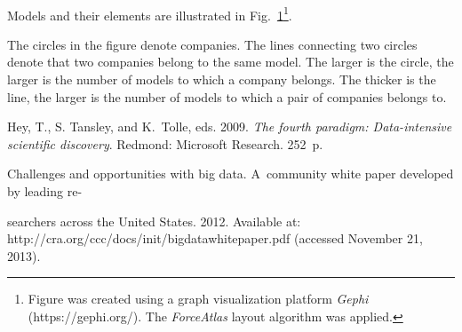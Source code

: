 \begin{figure} %
   \vspace*{1pt}
 \begin{center}
 \mbox{%
 \epsfxsize=120mm
 }
 \end{center}
 \vspace*{-9pt}
  \label{f6-kal}
  \vspace*{-3pt}
  \end{figure}

\begin{multicols}{2}
  

{\small
 Models and their elements are illustrated in Fig.~\ref{f6-kal}\footnote
 {Figure was
created using a graph visualization platform \textit{Gephi} ({\sf https://gephi.org/}).
The \textit{ForceAtlas} layout algorithm was applied.}.

The circles in the figure denote companies. The lines connecting two circles denote that
two companies belong to the same model. The larger is the circle, the larger is the number
of models to which a company belongs. The thicker is the line, the larger is the number
of models to which a pair of companies belongs to.}



{\small\frenchspacing
{%
\begin{thebibliography}{99}

Hey, T., S. Tansley, and K.~Tolle, eds. 2009. \textit{The fourth paradigm: Data-intensive
scientific discovery}. Redmond: Microsoft Research. 252~p.

Challenges and opportunities with big data.  A~community white paper developed by
leading re-\linebreak\vspace*{-12pt}

\pagebreak

\noindent
searchers across the United States. 2012. Available at: {\sf
http://cra.org/ccc/docs/init/bigdatawhitepaper.pdf} (accessed November 21, 2013).


\end{thebibliography}}}
\end{multicols}
